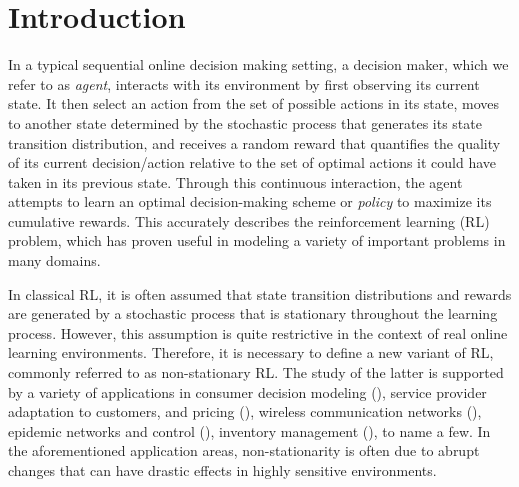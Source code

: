 \documentclass{article} %
\begin{document}

\section{Introduction}
In a typical sequential online decision making setting, a decision maker, which we refer to as \emph{agent}, interacts with its environment by first observing its current state. It then select an action from the set of possible actions in its state, moves to another state determined by the stochastic process that generates its state transition distribution, and receives a random reward that quantifies the quality of its current decision/action relative to the set of optimal actions it could have taken in its previous state. Through this continuous interaction, the agent attempts to learn an optimal decision-making scheme or \emph{policy} to maximize its cumulative rewards. This accurately describes the reinforcement learning (RL) problem, which has proven useful in modeling a variety of important problems in many domains.

In classical RL, it is often assumed that state transition distributions and rewards are generated by a stochastic process that is stationary throughout the learning process. However, this assumption is quite restrictive in the context of real online learning environments. Therefore, it is necessary to define a new variant of RL, commonly referred to as non-stationary RL. The study of the latter is supported by a variety of applications in consumer decision modeling (\cite{xu2020reinforcement}), service provider adaptation to customers, and pricing (\cite{taylor2018demand, kanoria2019blind, bimpikis2019spatial, gurvich2019operations}), wireless communication networks (\cite{zhou2015wireless, zhou2016repeated}), epidemic networks and control (\cite{nowzari2016analysis, kiss2017mathematics}), inventory management (\cite{agrawal2019learning, huh2009nonparametric}), to name a few. In the aforementioned application areas, non-stationarity is often due to abrupt changes that can have drastic effects in highly sensitive environments.
\end{document}
